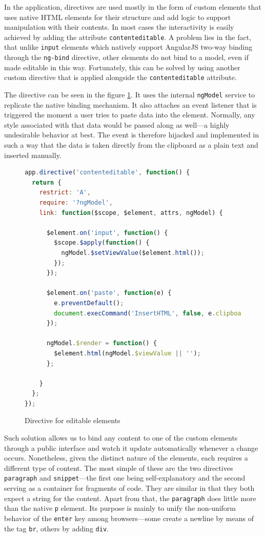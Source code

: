 \documentclass[thesis=M,english,hidelinks]{FITthesis}[2012/10/20]
\newcommand{\code}{\texttt}
\begin{document}
In the application, directives are used mostly in the form of custom elements that uses native HTML elements for their structure and add logic to support manipulation with their contents. In most cases the interactivity is easily achieved by adding the attribute \code{contenteditable}. A problem lies in the fact, that unlike \code{input} elements which natively support AngularJS two-way binding through the \code{ng-bind} directive, other elements do not bind to a model, even if made editable in this way. Fortunately, this can be solved by using another custom directive that is applied alongside the \code{contenteditable} attribute.

The directive can be seen in the figure \ref{fig:contenteditable_directive}. It uses the internal \code{ngModel} service to replicate the native binding mechanism. It also attaches an event listener that is triggered the moment a user tries to paste data into the element. Normally, any style associated with that data would be passed along as well---a highly undesirable behavior at best. The event is therefore hijacked and implemented in such a way that the data is taken directly from the clipboard as a plain text and inserted manually.

\begin{figure}[h]
  \begin{lstlisting}[language=JavaScript]
app.directive('contenteditable', function() {
  return {
    restrict: 'A',
    require: '?ngModel',
    link: function($scope, $element, attrs, ngModel) {

      $element.on('input', function() {
        $scope.$apply(function() {
          ngModel.$setViewValue($element.html());
        });
      });

      $element.on('paste', function(e) {
        e.preventDefault();
        document.execCommand('InsertHTML', false, e.clipboardData.getData('text/plain'));
      });

      ngModel.$render = function() {
        $element.html(ngModel.$viewValue || '');
      };

    }
  };
});
  \end{lstlisting}
  \caption{Directive for editable elements}
  \label{fig:contenteditable_directive}
\end{figure}

Such solution allows us to bind any content to one of the custom elements through a public interface and watch it update automatically whenever a change occurs. Nonetheless, given the distinct nature of the elements, each requires a different type of content. The most simple of these are the two directives \code{paragraph} and \code{snippet}---the first one being self-explanatory and the second serving as a container for fragments of code. They are similar in that they both expect a string for the content. Apart from that, the \code{paragraph} does little more than the native \code{p} element. Its purpose is mainly to unify the non-uniform behavior of the \code{enter} key among browsers---some create a newline by means of the tag \code{br}, others by adding \code{div}.
\end{document}
